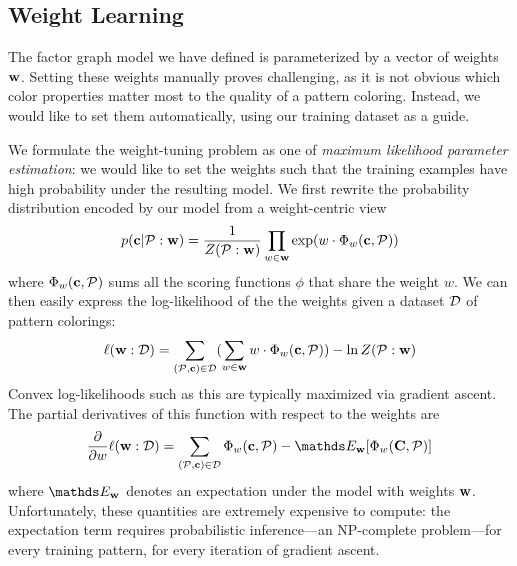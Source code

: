 \subsection{Weight Learning}
\label{sec:weights}

The factor graph model we have defined is parameterized by a vector of weights $\mathbf{w}$. Setting these weights manually proves challenging, as it is not obvious which color properties matter most to the quality of a pattern coloring. Instead, we would like to set them automatically, using our training dataset as a guide.

We formulate the weight-tuning problem as one of \emph{maximum likelihood parameter estimation}: we would like to set the weights such that the training examples have high probability under the resulting model. We first rewrite the probability distribution encoded by our model from a weight-centric view
\begin{equation*}
p(\mathbf{c} | \mathcal{P} : \mathbf{w}) = \frac{1}{Z(\mathcal{P} : \mathbf{w})} \prod_{w \in \mathbf{w}} \exp(w \cdot \Phi_w(\mathbf{c}, \mathcal{P}))
\end{equation*}
where $\Phi_w(\mathbf{c}, \mathcal{P})$ sums all the scoring functions $\phi$ that share the weight $w$. We can then easily express the log-likelihood of the the weights given a dataset $\mathcal{D}$ of pattern colorings:
\begin{equation*}
\ell(\mathbf{w} : \mathcal{D}) =
	\sum_{(\mathcal{P}, \mathbf{c}) \in \mathcal{D}}
	(
		\sum_{w \in \mathbf{w}}
			w \cdot \Phi_w(\mathbf{c}, \mathcal{P})
	)			
		- \ln{Z(\mathcal{P}: \mathbf{w})}
\end{equation*}
Convex log-likelihoods such as this are typically maximized via gradient ascent. The partial derivatives of this function with respect to the weights are
\begin{equation*}
\frac{\partial}{\partial w} \ell(\weights : \dataset) = 
	\sum_{(\pattern, \colors) \in \dataset}
			\weightStats(\colors, \pattern)
		- \expectation_\weights[\weightStats(\colorVars, \pattern)]
\end{equation*}
where $\expectation_\weights$ denotes an expectation under the model with weights $\mathbf{w}$. Unfortunately, these quantities are extremely expensive to compute: the expectation term requires probabilistic inference---an NP-complete problem---for every training pattern, for every iteration of gradient ascent.

